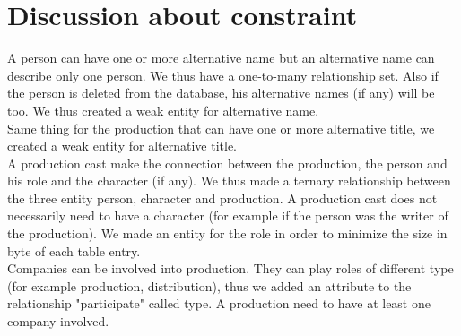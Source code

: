 \documentclass{article}
\begin{document}
\section{Discussion about constraint}
A person can have one or more alternative name but an alternative name can describe only one person. We thus have a one-to-many relationship set. Also if the person is deleted from the database, his alternative names (if any) will be too. We thus created a weak entity for alternative name. \\

Same thing for the production that can have one or more alternative title, we created a weak entity for alternative title. \\

A production cast make the connection between the production, the person and his role and the character (if any). We thus made a ternary relationship between the three entity person, character and production. A production cast does not necessarily need to have a character (for example if the person was the writer of the production). We made an entity for the role in order to minimize the size in byte of each table entry. \\

Companies can be involved into production. They can play roles of different type (for example production, distribution), thus we added an attribute to the relationship "participate" called type. A production need to have at least one company involved. \\
 
\end{document}

